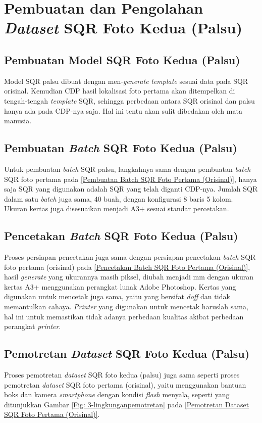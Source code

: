 \section{Pembuatan dan Pengolahan \emph{Dataset} SQR Foto Kedua (Palsu)}
\subsection{Pembuatan Model SQR Foto Kedua (Palsu)}
Model SQR palsu dibuat dengan men-\emph{generate} \emph{template} sesuai data pada SQR orisinal. Kemudian CDP hasil lokalisasi foto pertama akan ditempelkan di
tengah-tengah \emph{template} SQR, sehingga perbedaan antara SQR orisinal dan palsu hanya ada pada CDP-nya saja. Hal ini tentu akan sulit dibedakan oleh mata
manusia.

\subsection{Pembuatan \emph{Batch} SQR Foto Kedua (Palsu)} Untuk pembuatan \emph{batch} SQR palsu, langkahnya sama dengan pembuatan \emph{batch} SQR foto pertama pada \ref{Pembuatan Batch SQR
	Foto Pertama (Orisinal)}, hanya saja SQR yang digunakan adalah SQR yang telah diganti CDP-nya. Jumlah SQR dalam satu \emph{batch} juga sama, 40 buah, dengan
konfigurasi 8 baris 5 kolom. Ukuran kertas juga disesuaikan menjadi A3+ sesuai standar percetakan.

\subsection{Pencetakan \emph{Batch} SQR Foto Kedua (Palsu)} Proses persiapan pencetakan juga sama dengan persiapan pencetakan \emph{batch} SQR foto pertama (orisinal) pada \ref{Pencetakan Batch
	SQR Foto Pertama (Orisinal)}, hasil \emph{generate} yang ukurannya masih piksel, diubah menjadi mm dengan ukuran kertas A3+ menggunakan perangkat lunak Adobe
Photoshop. Kertas yang digunakan untuk mencetak juga sama, yaitu yang bersifat \emph{doff} dan tidak memantulkan cahaya. \emph{Printer} yang digunakan untuk
mencetak haruslah sama, hal ini untuk memastikan tidak adanya perbedaan kualitas akibat perbedaan perangkat \emph{printer}.

\subsection{Pemotretan \emph{Dataset} SQR Foto Kedua (Palsu)} Proses pemotretan \emph{dataset} SQR foto kedua (palsu) juga sama seperti proses pemotretan \emph{dataset} SQR foto pertama (orisinal),
yaitu menggunakan bantuan boks dan kamera \emph{smartphone} dengan kondisi \emph{flash} menyala, seperti yang ditunjukkan Gambar \ref{Fig:
	3-lingkunganpemotretan} pada \ref{Pemotretan Dataset SQR Foto Pertama (Orisinal)}.

